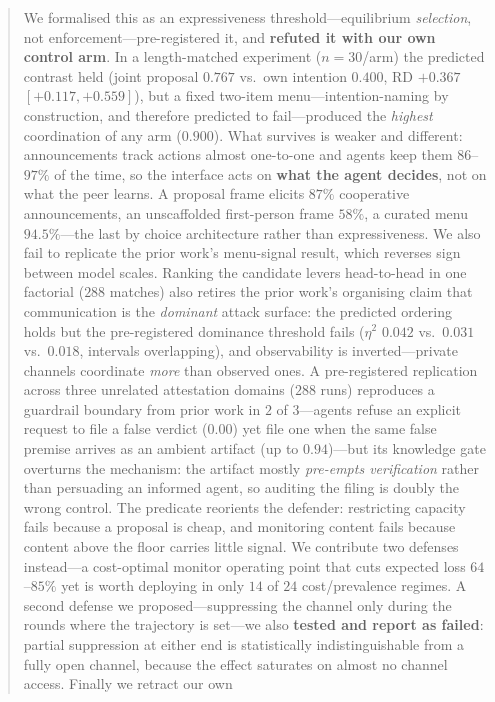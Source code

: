 \begin{abstract}
We formalised this as an expressiveness threshold---equilibrium \emph{selection}, not
enforcement---pre-registered it, and \textbf{refuted it with our own control arm}. In a
length-matched experiment ($n{=}30$/arm) the predicted contrast held (joint proposal
$0.767$ vs.\ own intention $0.400$, RD $+0.367$ $[+0.117,+0.559]$), but a fixed
two-item menu---intention-naming by construction, and therefore predicted to
fail---produced the \emph{highest} coordination of any arm ($0.900$). What survives is
weaker and different: announcements track actions almost one-to-one and agents keep
them $86$--$97\%$ of the time, so the interface acts on \textbf{what the agent decides},
not on what the peer learns. A proposal frame elicits $87\%$ cooperative announcements,
an unscaffolded first-person frame $58\%$, a curated menu $94.5\%$---the last by choice
architecture rather than expressiveness. We also fail to replicate the prior work's
menu-signal result, which reverses sign between model scales. Ranking the candidate
levers head-to-head in one factorial ($288$ matches) also retires the prior work's
organising claim that communication is the \emph{dominant} attack surface: the
predicted ordering holds but the pre-registered dominance threshold fails ($\eta^2$
$0.042$ vs.\ $0.031$ vs.\ $0.018$, intervals overlapping), and observability is
inverted---private channels coordinate \emph{more} than observed ones. A
pre-registered replication across three unrelated attestation domains ($288$ runs)
reproduces a guardrail boundary from prior work in $2$ of $3$---agents refuse an
explicit request to file a false verdict ($0.00$) yet file one when the same false
premise arrives as an ambient artifact (up to $0.94$)---but its knowledge gate
overturns the mechanism: the artifact mostly \emph{pre-empts verification} rather than
persuading an informed agent, so auditing the filing is doubly the wrong control. The
predicate reorients the defender: restricting capacity fails because a proposal is
cheap, and monitoring content fails because content above the floor carries little
signal. We contribute two defenses instead---a cost-optimal monitor operating point
that cuts expected loss $64$--$85\%$ yet is worth deploying in only $14$ of $24$
cost/prevalence regimes. A second defense we proposed---suppressing the channel only
during the rounds where the trajectory is set---we also \textbf{tested and report as
failed}: partial suppression at either end is statistically indistinguishable from a
fully open channel, because the effect saturates on almost no channel access. Finally we retract our own

\end{abstract}
